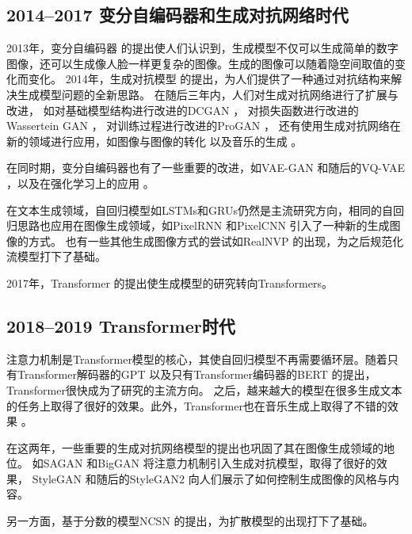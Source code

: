 \subsection{2014--2017 变分自编码器和生成对抗网络时代}
2013年，变分自编码器 {\cite{kingma2013auto}}的提出使人们认识到，生成模型不仅可以生成简单的数字图像，还可以生成像人脸一样更复杂的图像。生成的图像可以随着隐空间取值的变化而变化。
2014年，生成对抗模型 {\cite{goodfellow2020generative}}的提出，为人们提供了一种通过对抗结构来解决生成模型问题的全新思路。
在随后三年内，人们对生成对抗网络进行了扩展与改进，
如对基础模型结构进行改进的DCGAN {\cite{radford2015unsupervised}}，
对损失函数进行改进的Wassertein GAN {\cite{arjovsky2017wasserstein}}，
对训练过程进行改进的ProGAN {\cite{karras2017progressive}}，
还有使用生成对抗网络在新的领域进行应用，如图像与图像的转化 {\cite{isola2017image}\cite{zhu2017unpaired}}以及音乐的生成 {\cite{dong2018musegan}}。

在同时期，变分自编码器也有了一些重要的改进，如VAE-GAN {\cite{larsen2016autoencoding}}和随后的VQ-VAE {\cite{razavi2019generating}}，以及在强化学习上的应用 {\cite{ha2018world}}。

在文本生成领域，自回归模型如LSTMs和GRUs仍然是主流研究方向，相同的自回归思路也应用在图像生成领域，如PixelRNN {\cite{van2016pixel}}和PixelCNN {\cite{van2016conditional}}引入了一种新的生成图像的方式。
也有一些其他生成图像方式的尝试如RealNVP {\cite{dinh2016density}}的出现，为之后规范化流模型打下了基础。

2017年，Transformer {\cite{vaswani2017attention}}的提出使生成模型的研究转向Transformers。
\subsection{2018--2019 Transformer时代}
注意力机制是Transformer模型的核心，其使自回归模型不再需要循环层。随着只有Transformer解码器的GPT {\cite{radford2018improving}}以及只有Transformer编码器的BERT {\cite{devlin2018bert}}的提出，Transformer很快成为了研究的主流方向。
之后，越来越大的模型在很多生成文本的任务上取得了很好的效果。此外，Transformer也在音乐生成上取得了不错的效果 {\cite{huang2018music}}。

在这两年，一些重要的生成对抗网络模型的提出也巩固了其在图像生成领域的地位。
如SAGAN {\cite{zhang2019self}}和BigGAN {\cite{brock2018large}}将注意力机制引入生成对抗模型，取得了很好的效果，
StyleGAN {\cite{karras2019style}}和随后的StyleGAN2 {\cite{karras2020analyzing}}向人们展示了如何控制生成图像的风格与内容。

另一方面，基于分数的模型NCSN {\cite{song2019generative}}的提出，为扩散模型的出现打下了基础。
